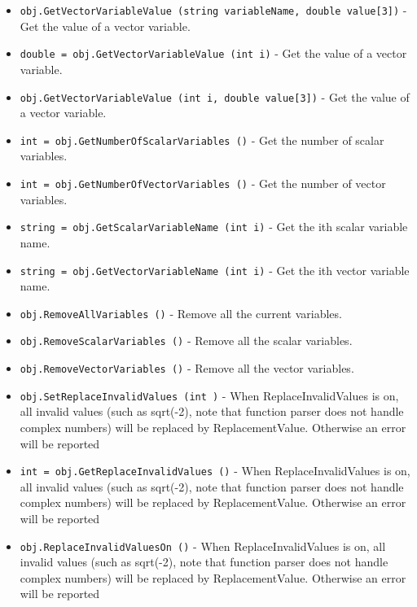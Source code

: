 \begin{itemize}
\item  \verb|obj.GetVectorVariableValue (string variableName, double value[3])| -  Get the value of a vector variable.

\item  \verb|double = obj.GetVectorVariableValue (int i)| -  Get the value of a vector variable.

\item  \verb|obj.GetVectorVariableValue (int i, double value[3])| -  Get the value of a vector variable.

\item  \verb|int = obj.GetNumberOfScalarVariables ()| -  Get the number of scalar variables.

\item  \verb|int = obj.GetNumberOfVectorVariables ()| -  Get the number of vector variables.

\item  \verb|string = obj.GetScalarVariableName (int i)| -  Get the ith scalar variable name.

\item  \verb|string = obj.GetVectorVariableName (int i)| -  Get the ith vector variable name.

\item  \verb|obj.RemoveAllVariables ()| -  Remove all the current variables.

\item  \verb|obj.RemoveScalarVariables ()| -  Remove all the scalar variables.

\item  \verb|obj.RemoveVectorVariables ()| -  Remove all the vector variables.

\item  \verb|obj.SetReplaceInvalidValues (int )| -  When ReplaceInvalidValues is on, all invalid values (such as
 sqrt(-2), note that function parser does not handle complex
 numbers) will be replaced by ReplacementValue. Otherwise an
 error will be reported

\item  \verb|int = obj.GetReplaceInvalidValues ()| -  When ReplaceInvalidValues is on, all invalid values (such as
 sqrt(-2), note that function parser does not handle complex
 numbers) will be replaced by ReplacementValue. Otherwise an
 error will be reported

\item  \verb|obj.ReplaceInvalidValuesOn ()| -  When ReplaceInvalidValues is on, all invalid values (such as
 sqrt(-2), note that function parser does not handle complex
 numbers) will be replaced by ReplacementValue. Otherwise an
 error will be reported


\end{itemize}
